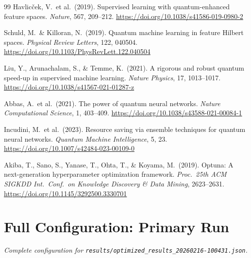 \documentclass[twocolumn,10pt]{article}
\begin{document}
\begin{thebibliography}{99}
Havlic\v{c}ek, V.\ et al.\ (2019).
Supervised learning with quantum-enhanced feature spaces.
\textit{Nature}, 567, 209--212.
\url{https://doi.org/10.1038/s41586-019-0980-2}

Schuld, M.\ \& Killoran, N.\ (2019).
Quantum machine learning in feature Hilbert spaces.
\textit{Physical Review Letters}, 122, 040504.
\url{https://doi.org/10.1103/PhysRevLett.122.040504}

Liu, Y., Arunachalam, S., \& Temme, K.\ (2021).
A rigorous and robust quantum speed-up in supervised machine learning.
\textit{Nature Physics}, 17, 1013--1017.
\url{https://doi.org/10.1038/s41567-021-01287-z}

Abbas, A.\ et al.\ (2021).
The power of quantum neural networks.
\textit{Nature Computational Science}, 1, 403--409.
\url{https://doi.org/10.1038/s43588-021-00084-1}

Incudini, M.\ et al.\ (2023).
Resource saving via ensemble techniques for quantum neural networks.
\textit{Quantum Machine Intelligence}, 5, 23.
\url{https://doi.org/10.1007/s42484-023-00109-0}

Akiba, T., Sano, S., Yanase, T., Ohta, T., \& Koyama, M.\ (2019).
Optuna: A next-generation hyperparameter optimization framework.
\textit{Proc.\ 25th ACM SIGKDD Int.\ Conf.\ on Knowledge Discovery \& Data Mining}, 2623--2631.
\url{https://doi.org/10.1145/3292500.3330701}

\end{thebibliography}


\appendix

\section{Full Configuration: Primary Run}
\label{app:primary_config}

\textit{Complete configuration for \texttt{results/optimized\_results\_20260216-100431.json}.}
\end{document}
